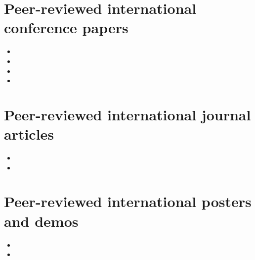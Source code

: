 \section*{Peer-reviewed international conference papers}

\begin{itemize}
    \item \papercloudrefr
    \item \papersnprefr
    \item \papervtoxrefr
    \item \papertimerefr
\end{itemize}

\section*{Peer-reviewed international journal articles}

\begin{itemize}
    \item \papersupplyrefr
    \item \paperauthexecrefr
\end{itemize}

\section*{Peer-reviewed international posters and demos}

\begin{itemize}
    \item \demovtoxrefr
    \item \posterauthexecrefr
\end{itemize}